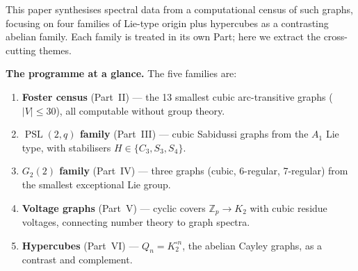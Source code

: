 \documentclass[11pt,a4paper]{article}
\theoremstyle{plain}
\theoremstyle{definition}
\theoremstyle{remark}
\newcommand{\Z}{\mathbb{Z}}
\newcommand{\PSL}{\operatorname{PSL}}
\begin{document}
This paper synthesises spectral data from a computational census of such
graphs, focusing on four families of Lie-type origin plus hypercubes as a
contrasting abelian family.
Each family is treated in its own Part; here we extract the
cross-cutting themes.

\begin{tcolorbox}[breakable, colback=yellow!10, colframe=yellow!10,
  boxrule=0pt, sharp corners]
\textbf{The programme at a glance.}
The five families are:
\begin{enumerate}[noitemsep]
\item \textbf{Foster census} (Part~II) --- the 13 smallest cubic arc-transitive
  graphs ($|V| \le 30$), all computable without group theory.
\item \textbf{$\PSL(2,q)$ family} (Part~III) --- cubic Sabidussi graphs from the
  $A_1$ Lie type, with stabilisers $H \in \{C_3, S_3, S_4\}$.
\item \textbf{$G_2(2)$ family} (Part~IV) --- three graphs (cubic, 6-regular,
  7-regular) from the smallest exceptional Lie group.
\item \textbf{Voltage graphs} (Part~V) --- cyclic covers $\Z_p \to K_2$ with cubic
  residue voltages, connecting number theory to graph spectra.
\item \textbf{Hypercubes} (Part~VI) --- $Q_n = K_2^{\square n}$, the abelian
  Cayley graphs, as a contrast and complement.
\end{enumerate}
\end{tcolorbox}
\end{document}

